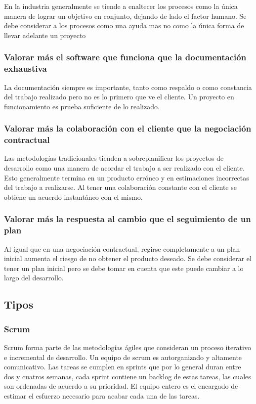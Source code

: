 En la industria generalmente se tiende a enaltecer los procesos como la única
manera de lograr un objetivo en conjunto, dejando de lado el factor humano.
Se debe considerar a los procesos como una ayuda mas no como la única forma
de llevar adelante un proyecto

\subsubsection{Valorar más el software que funciona que la documentación exhaustiva}

La documentación siempre es importante, tanto como respaldo o como constancia
del trabajo realizado pero no es lo primero que ve el cliente. Un proyecto
en funcionamiento es prueba suficiente de lo realizado.

\subsubsection{Valorar más la colaboración con el cliente que la negociación contractual}

Las metodologías tradicionales tienden a sobreplanificar los proyectos de
desarrollo como una manera de acordar el trabajo a ser realizado con el cliente.
Esto generalmente termina en un producto erróneo y en estimaciones incorrectas
del trabajo a realizarse. Al tener una colaboración constante con el cliente
se obtiene un acuerdo instantáneo con el mismo.

\subsubsection{Valorar más la respuesta al cambio que el seguimiento de un plan}

Al igual que en una negociación contractual, regirse completamente a un
plan inicial aumenta el riesgo de no obtener el producto deseado. Se debe
considerar el tener un plan inicial pero se debe tomar en cuenta que
este puede cambiar a lo largo del desarrollo.

\subsection{Tipos}

\subsubsection{Scrum}

Scrum forma parte de las metodologías ágiles que consideran un proceso
iterativo e incremental de desarrollo. Un equipo de scrum es
autorganizado y altamente comunicativo. Las tareas se cumplen en sprints
que por lo general duran entre dos y cuatros semanas, cada sprint
contiene un backlog de estas tareas, las cuales son ordenadas de acuerdo
a su prioridad. El equipo entero es el encargado de estimar el
esfuerzo necesario para acabar cada una de las tareas.

